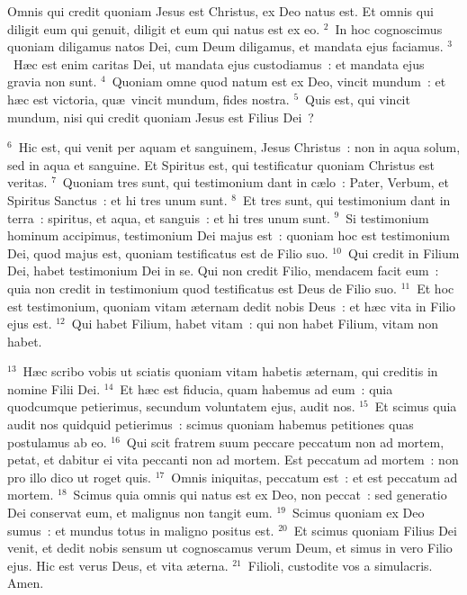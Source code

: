 \lettrine[lines=10,image=true,loversize=0.05,lraise=-0.03]{O}{}mnis qui credit quoniam Jesus est Christus, ex Deo natus est. Et omnis qui diligit eum qui genuit, diligit et eum qui natus est ex eo.
${}^{2}$~In hoc cognoscimus quoniam diligamus natos Dei, cum Deum diligamus, et mandata ejus faciamus.
${}^{3}$~H\ae c est enim caritas Dei, ut mandata ejus custodiamus~: et mandata ejus gravia non sunt.
${}^{4}$~Quoniam omne quod natum est ex Deo, vincit mundum~: et h\ae c est victoria, qu\ae\ vincit mundum, fides nostra.
${}^{5}$~Quis est, qui vincit mundum, nisi qui credit quoniam Jesus est Filius Dei~?


${}^{6}$~Hic est, qui venit per aquam et sanguinem, Jesus Christus~: non in aqua solum, sed in aqua et sanguine. Et Spiritus est, qui testificatur quoniam Christus est veritas.
${}^{7}$~Quoniam tres sunt, qui testimonium dant in c\ae lo~: Pater, Verbum, et Spiritus Sanctus~: et hi tres unum sunt.
${}^{8}$~Et tres sunt, qui testimonium dant in terra~: spiritus, et aqua, et sanguis~: et hi tres unum sunt.
${}^{9}$~Si testimonium hominum accipimus, testimonium Dei majus est~: quoniam hoc est testimonium Dei, quod majus est, quoniam testificatus est de Filio suo.
${}^{10}$~Qui credit in Filium Dei, habet testimonium Dei in se. Qui non credit Filio, mendacem facit eum~: quia non credit in testimonium quod testificatus est Deus de Filio suo.
${}^{11}$~Et hoc est testimonium, quoniam vitam \ae ternam dedit nobis Deus~: et h\ae c vita in Filio ejus est.
${}^{12}$~Qui habet Filium, habet vitam~: qui non habet Filium, vitam non habet.


${}^{13}$~H\ae c scribo vobis ut sciatis quoniam vitam habetis \ae ternam, qui creditis in nomine Filii Dei.
${}^{14}$~Et h\ae c est fiducia, quam habemus ad eum~: quia quodcumque petierimus, secundum voluntatem ejus, audit nos.
${}^{15}$~Et scimus quia audit nos quidquid petierimus~: scimus quoniam habemus petitiones quas postulamus ab eo.
${}^{16}$~Qui scit fratrem suum peccare peccatum non ad mortem, petat, et dabitur ei vita peccanti non ad mortem. Est peccatum ad mortem~: non pro illo dico ut roget quis.
${}^{17}$~Omnis iniquitas, peccatum est~: et est peccatum ad mortem.
${}^{18}$~Scimus quia omnis qui natus est ex Deo, non peccat~: sed generatio Dei conservat eum, et malignus non tangit eum.
${}^{19}$~Scimus quoniam ex Deo sumus~: et mundus totus in maligno positus est.
${}^{20}$~Et scimus quoniam Filius Dei venit, et dedit nobis sensum ut cognoscamus verum Deum, et simus in vero Filio ejus. Hic est verus Deus, et vita \ae terna.
${}^{21}$~Filioli, custodite vos a simulacris. Amen.
